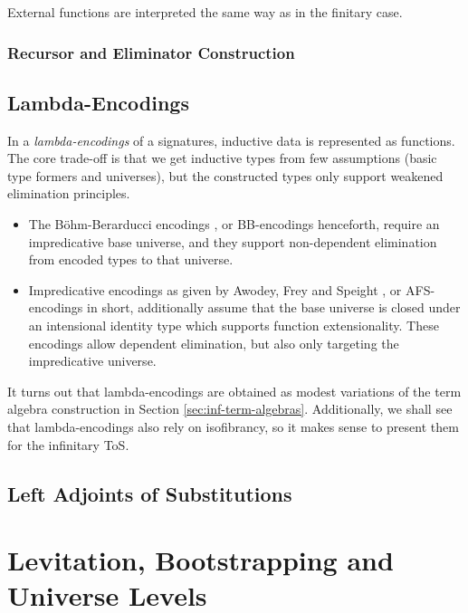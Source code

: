 \documentclass[12pt,a4paper,twoside,openany]{book}
\theoremstyle{remark}
\theoremstyle{definition}
\theoremstyle{theorem}
\begin{document}
External functions are interpreted the same way as in the finitary case.

\subsection{Recursor and Eliminator Construction}


\section{Lambda-Encodings}

In a \emph{lambda-encodings} of a signatures, inductive data is represented as
functions. The core trade-off is that we get inductive types from few
assumptions (basic type formers and universes), but the constructed types only
support weakened elimination principles.
\begin{itemize}
  \item The Böhm-Berarducci encodings \cite{boehm-berarducci}, or BB-encodings
    henceforth, require an impredicative base universe, and they support
    non-dependent elimination from encoded types to that universe.
  \item Impredicative encodings as given by Awodey, Frey and Speight
    \cite{afs-encoding}, or AFS-encodings in short, additionally assume that the
    base universe is closed under an intensional identity type which supports
    function extensionality. These encodings allow dependent elimination, but
    also only targeting the impredicative universe.
\end{itemize}
It turns out that lambda-encodings are obtained as modest variations of the term
algebra construction in Section \ref{sec:inf-term-algebras}. Additionally, we shall see that lambda-encodings also rely
on isofibrancy, so it makes sense to present them for the infinitary ToS.















\section{Left Adjoints of Substitutions}



\chapter{Levitation, Bootstrapping and Universe Levels}
\label{chap:levitation}
\end{document}
